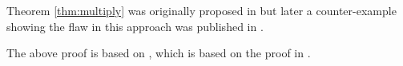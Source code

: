 Theorem \ref{thm:multiply} was originally proposed in
\cite{bruckWhatLoop1963}
but later a counter-example showing the flaw in this approach was published in
\cite{mullinCounterexampleDirectProduct1969}.

The above proof is based on
\cite{andersonCombinatorialDesignsConstruction1990},
which is based on the proof in
\cite{stantonMultiplicationTheoremRoom1972a}.

